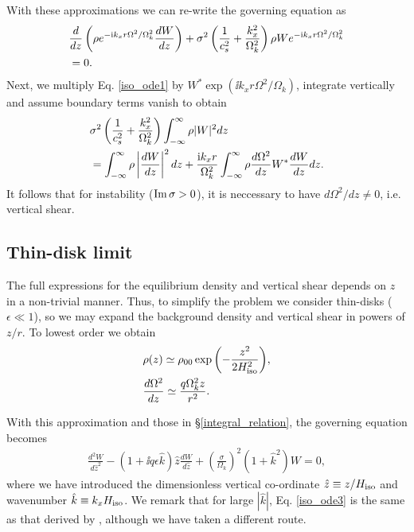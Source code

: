 With these approximations we can re-write the governing equation as
\begin{align}\label{iso_ode1}
  &\frac{d}{dz}\left(\rho e^{-\mathrm{i} k_x r
      \Omega^2/\Omega_k^2}\frac{dW}{dz}\right) +
  \sigma^2\left(\frac{1}{c_s^2}+\frac{k_x^2}{\Omega_k^2}\right) \rho W e^{-\mathrm{i} k_x r
    \Omega^2/\Omega_k^2} \notag\\
  &=0.
\end{align}
Next, we multiply Eq. \ref{iso_ode1} by $W^{*}\exp{\left(\ii k_x r
    \Omega^2/\Omega_k\right)}$, integrate 
vertically and assume boundary terms vanish to obtain
\begin{align}\label{neccessary_cond}
   &\sigma^2\left(\frac{1}{c_s^2}+\frac{k_x^2}{\Omega_k^2}\right)\int_{-\infty}^{\infty}\rho|W|^2dz \notag\\
  &=\int_{-\infty}^{\infty}\rho\left|\frac{dW}{dz}\right|^2dz 
  +\frac{\mathrm{i} k_x r}{\Omega_k^2}\int_{-\infty}^{\infty}\rho\frac{d\Omega^2}{dz}W^*\frac{dW}{dz}dz. 
\end{align}
It follows that for instability ($\operatorname{Im}\sigma>0$), it is neccessary to
have $d\Omega^2/dz\neq 0$, i.e. vertical shear.  


\subsection{Thin-disk limit}
The full expressions for the equilibrium density and vertical shear
depends on $z$ in a non-trivial manner. Thus, to simplify the problem 
we consider thin-disks ($\epsilon\ll1$), 
so we may expand the background density and vertical shear in powers
of $z/r$. To lowest order we obtain
\begin{align}
  &\rho(z) \simeq \rho_{00} \exp{\left(-\frac{z^2}{2H_\mathrm{iso}^2}\right)},\label{thin_dens}\\
  &\frac{d\Omega^2}{dz} \simeq \frac{q\Omega_k^2z}{r^2}. \label{thin_vshear}
\end{align}


With this approximation and those in \S\ref{integral_relation}, the
governing equation becomes
\begin{align}\label{iso_ode3}
  \frac{d^2W}{d\hat{z}^2} - \left(1 + \ii q\epsilon
    \hat{k}\right)\hat{z}\frac{dW}{d\hat{z}} +
  \left(\frac{\sigma}{\Omega_k}\right)^2\left(1+\hat{k}^2\right)W = 
  0, 
\end{align}
where we have introduced the dimensionless vertical co-ordinate
$\hat{z} \equiv z/H_\mathrm{iso}$ and wavenumber $\hat{k} \equiv k_x H_\mathrm{iso}$. We 
remark that for large $|\hat{k}|$, Eq. \ref{iso_ode3} is the same as
that derived by \cite{nelson13}, although we have taken a different
route.  

